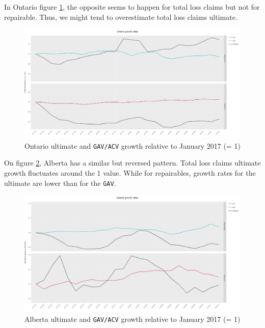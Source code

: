 	In Ontario figure \ref{Fig_ON_growth}, the opposite seems to happen for total loss claims but not for repairable. Thus, we might tend to overestimate total loss claims ultimate.
	\begin{figure}[H]
		\begin{center}
			\includegraphics[scale=0.2]{Graphiques/ON_growth} 
			\renewcommand{\figurename}{Figure}
			\caption{Ontario ultimate and \texttt{GAV/ACV} growth relative to January 2017 (= 1)}\label{Fig_ON_growth}
		\end{center}
	\end{figure}
	On figure \ref{Fig_AB_growth}, Alberta has a similar but reversed pattern. Total loss claims ultimate growth fluctuates around the 1 value. While for repairables, growth rates for the ultimate are lower than for the \texttt{GAV}.  
	\begin{figure}[H]
		\begin{center}
			\includegraphics[scale=0.2]{Graphiques/AB_growth} 
			\renewcommand{\figurename}{Figure}
			\caption{Alberta ultimate and \texttt{GAV/ACV} growth relative to January 2017 (= 1)}\label{Fig_AB_growth}
		\end{center}
	\end{figure}

